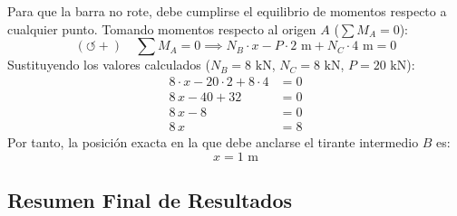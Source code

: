 

Para que la barra no rote, debe cumplirse el equilibrio de momentos respecto a cualquier punto. Tomando momentos respecto al origen $A$ ($\sum M_A = 0$):
\begin{equation}
    (\circlearrowleft +) \quad \sum M_A = 0 \implies N_B \cdot x - P \cdot 2\text{ m} + N_C \cdot 4\text{ m} = 0
    \label{eq:eq_momentos_A}
\end{equation}
Sustituyendo los valores calculados ($N_B = 8\text{ kN}$, $N_C = 8\text{ kN}$, $P = 20\text{ kN}$):
\begin{align}
    8 \cdot x - 20 \cdot 2 + 8 \cdot 4 & = 0 \nonumber \\
    8\,x - 40 + 32                     & = 0 \nonumber \\
    8\,x - 8                           & = 0 \nonumber \\
    8\,x                               & = 8
\end{align}
Por tanto, la posición exacta en la que debe anclarse el tirante intermedio $B$ es:
\begin{equation}
    \boxed{x = 1\text{ m}}
\end{equation}


\subsection*{Resumen Final de Resultados}

